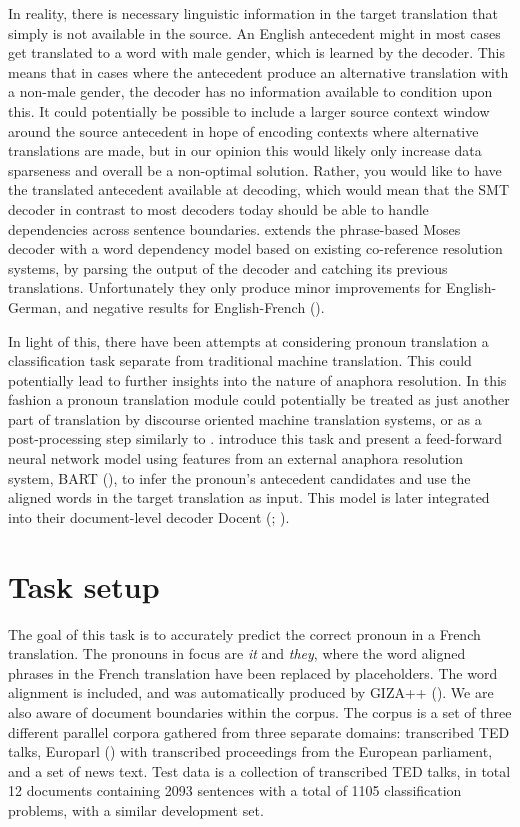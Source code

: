 \documentclass[11pt]{article}
\begin{document}
In reality, there is necessary linguistic information in the target translation that simply is not available in the source.
An English antecedent might in most cases get translated to a word with male gender, which is learned by the decoder.
This means that in cases where the antecedent produce an alternative translation with a non-male gender, the decoder has no information available to condition upon this.
It could potentially be possible to include a larger source context window around the source antecedent in hope of encoding contexts where alternative translations are made, but in our opinion this would likely only increase data sparseness and overall be a non-optimal solution.
Rather, you would like to have the translated antecedent available at decoding, which would mean that the SMT decoder in contrast to most decoders today should be able to handle dependencies across sentence boundaries.
\textcite{Hardmeier2010Modelling} extends the phrase-based Moses decoder with a word dependency model based on existing co-reference resolution systems, by parsing the output of the decoder and catching its previous translations.
Unfortunately they only produce minor improvements for English-German, and negative results for English-French (\cite{Hardmeier2011UppsalaFbk}).

In light of this, there have been attempts at considering pronoun translation a classification task separate from traditional machine translation.
This could potentially lead to further insights into the nature of anaphora resolution.
In this fashion a pronoun translation module could potentially be treated as just another part of translation by discourse oriented machine translation systems, or as a post-processing step similarly to \textcite{Guillou2012Improving}.
\textcite{Hardmeier2013Latent} introduce this task and present a feed-forward neural network model using features from an external anaphora resolution system, BART (\cite{Broscheit2010Bart}), to infer the pronoun's antecedent candidates and use the aligned words in the target translation as input. This model is later integrated into their document-level decoder Docent (\cite[chapter~9]{Hardmeier2014Discoursea}; \cite{Hardmeier2013Docent}).

\section{Task setup}

The goal of this task is to accurately predict the correct pronoun in a French translation.
The pronouns in focus are \emph{it} and \emph{they}, where the word aligned phrases in the French translation have been replaced by placeholders.
The word alignment is included, and was automatically produced by GIZA++ (\cite{Och2003Giza}).
We are also aware of document boundaries within the corpus.
The corpus is a set of three different parallel corpora gathered from three separate domains:
transcribed TED talks, Europarl (\cite{Koehn2005Europarl}) with transcribed proceedings from the European parliament, and a set of news text.
Test data is a collection of transcribed TED talks, in total 12 documents containing 2093 sentences with a total of 1105 classification problems, with a similar development set.
\end{document}
